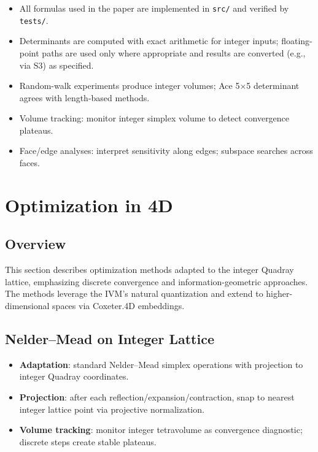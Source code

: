 \documentclass[
  10pt,
]{article}
\newcommand{\passthrough}[1]{#1}
\providecommand{\tightlist}{%
  \setlength{\itemsep}{0pt}\setlength{\parskip}{0pt}}
\begin{document}
\begin{itemize}
\tightlist
\item
  All formulas used in the paper are implemented in
  \passthrough{\lstinline!src/!} and verified by
  \passthrough{\lstinline!tests/!}.
\item
  Determinants are computed with exact arithmetic for integer inputs;
  floating-point paths are used only where appropriate and results are
  converted (e.g., via S3) as specified.
\item
  Random-walk experiments produce integer volumes; Ace 5×5 determinant
  agrees with length-based methods.
\item
  Volume tracking: monitor integer simplex volume to detect convergence
  plateaus.
\item
  Face/edge analyses: interpret sensitivity along edges; subspace
  searches across faces. 
\end{itemize}

\hypertarget{optimization-in-4d}{%
\section{Optimization in 4D}\label{optimization-in-4d}}

\hypertarget{overview-1}{%
\subsection{Overview}\label{overview-1}}

This section describes optimization methods adapted to the integer
Quadray lattice, emphasizing discrete convergence and
information-geometric approaches. The methods leverage the IVM's natural
quantization and extend to higher-dimensional spaces via Coxeter.4D
embeddings.

\hypertarget{neldermead-on-integer-lattice}{%
\subsection{Nelder--Mead on Integer
Lattice}\label{neldermead-on-integer-lattice}}

\begin{itemize}
\tightlist
\item
  \textbf{Adaptation}: standard Nelder--Mead simplex operations with
  projection to integer Quadray coordinates.
\item
  \textbf{Projection}: after each reflection/expansion/contraction, snap
  to nearest integer lattice point via projective normalization.
\item
  \textbf{Volume tracking}: monitor integer tetravolume as convergence
  diagnostic; discrete steps create stable plateaus.
\end{itemize}
\end{document}
